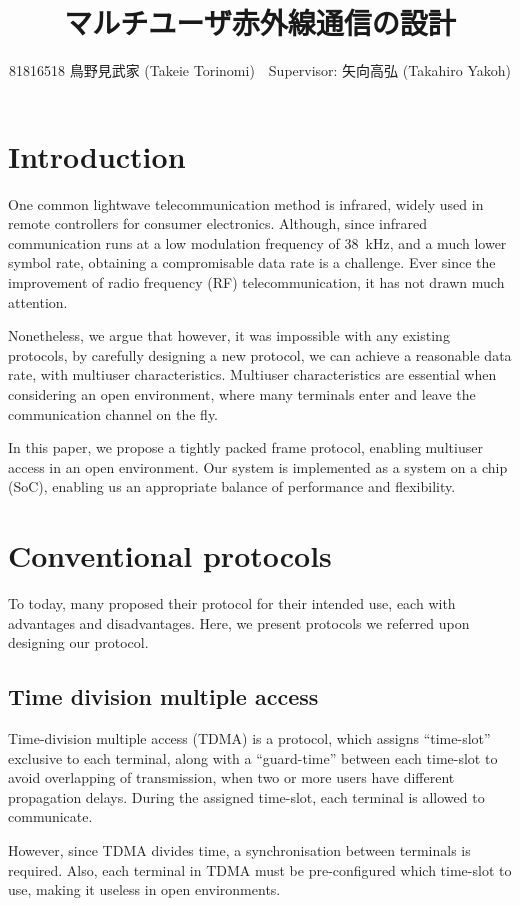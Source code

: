 ﻿\documentclass[twocolumn,9pt]{ltjsarticle}
\title{マルチユーザ赤外線通信の設計}
\author{81816518 鳥野見武家 (Takeie Torinomi)　Supervisor: 矢向高弘 (Takahiro Yakoh)}
\begin{document}
\maketitle
\section{Introduction}
One common lightwave telecommunication method is infrared, widely used in remote controllers for consumer electronics.
Although, since infrared communication runs at a low modulation frequency of \SI{38}{kHz}, and a much lower symbol rate, obtaining a compromisable data rate is a challenge.
Ever since the improvement of radio frequency (RF) telecommunication, it has not drawn much attention.

Nonetheless, we argue that however, it was impossible with any existing protocols, by carefully designing a new protocol, we can achieve a reasonable data rate, with multiuser characteristics.
Multiuser characteristics are essential when considering an open environment, where many terminals enter and leave the communication channel on the fly.

In this paper, we propose a tightly packed frame protocol, enabling multiuser access in an open environment.
Our system is implemented as a system on a chip (SoC), enabling us an appropriate balance of performance and flexibility.

\section{Conventional protocols}
To today, many proposed their protocol for their intended use, each with advantages and disadvantages.
Here, we present protocols we referred upon designing our protocol.

\subsection{Time division multiple access}
Time-division multiple access (TDMA) is a protocol, which assigns ``time-slot'' exclusive to each terminal, along with a ``guard-time'' between each time-slot to avoid overlapping of transmission, when two or more users have different propagation delays.
During the assigned time-slot, each terminal is allowed to communicate.

However, since TDMA divides time, a synchronisation between terminals is required.
Also, each terminal in TDMA must be pre-configured which time-slot to use, making it useless in open environments.
\end{document}

